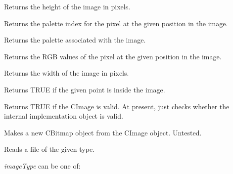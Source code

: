 \label{getheight}


Returns the height of the image in pixels.

\label{getindex}


Returns the palette index for the pixel at the given position in the image.

\label{getpalette}


Returns the palette associated with the image.

\label{getrgb}

 
Returns the RGB values of the pixel at the given position in the image.

\label{getwidth}


Returns the width of the image in pixels.

\label{inside}


Returns TRUE if the given point is inside the image.

\label{isok}


Returns TRUE if the CImage is valid. At present, just checks whether the internal
implementation object is valid.

\label{makebitmap}


Makes a new CBitmap object from the CImage object. Untested.

\label{readfile}


Reads a file of the given type.

{\it imageType} can be one of:

